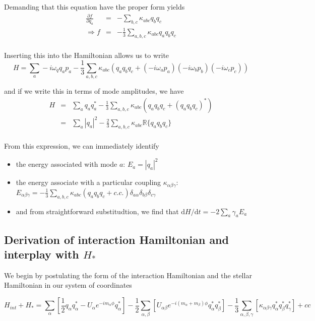 Demanding that this equation have the proper form yields
\begin{eqnarray}
\frac{\partial f}{\partial q_a} & = & - \sum_{b,c}\kappa_{abc} q_b q_c \\
\Rightarrow f & = & -\frac{1}{3}\sum_{a,b,c}\kappa_{abc} q_a q_b q_c \\
\end{eqnarray}

Inserting this into the Hamiltonian allows us to write
\begin{equation}
H = \sum_{a} -i\omega_q q_a p_a - \frac{1}{3} \sum_{a,b,c} \kappa_{abc} \left( q_a q_b q_c + (-i\omega_a p_a)(-i\omega_b p_b)(-i\omega_c p_c)\right)
\end{equation}

and if we write this in terms of mode amplitudes, we have
\begin{eqnarray}
H & = & \sum_{a} q_a q_a^\ast - \frac{1}{3} \sum_{a,b,c} \kappa_{abc} \left( q_a q_b q_c + (q_a q_b q_c)^\ast \right) \\
  & = & \sum_{a} |q_a|^2 - \frac{2}{3} \sum_{a,b,c} \kappa_{abc} \mathbb{R}\{ q_a q_b q_c \} \\
\end{eqnarray}

From this expression, we can immediately identify
\begin{itemize}
  \item{the energy associated with mode $a$: $E_a = |q_a|^2$}
  \item{the energy associate with a particular coupling $\kappa_{\alpha\beta\gamma}$: $E_{\alpha\beta\gamma} = -\frac{1}{3}\sum_{a,b,c} \kappa_{abc} (q_a q_b q_c + c.c.) \delta_{a\alpha} \delta_{b\beta} \delta_{c\gamma}$}
  \item{and from straightforward substitudtion, we find that $\mathrm{d}H/\mathrm{d}t = -2 \sum_{a} \gamma_a E_a$}
\end{itemize}

\subsection*{Derivation of interaction Hamiltonian and interplay with $H_\ast$}

We begin by postulating the form of the interaction Hamiltonian and the stellar Hamiltonian in our system of coordinates

\begin{equation}
H_{int} + H_{\ast} = \sum_{\alpha} \left[ \frac{1}{2} q_{\alpha} q_{\alpha}^\ast - U_{\alpha}e^{-i m_\alpha \phi} q_\alpha^\ast \right] - \frac{1}{2}\sum_{\alpha,\beta} \left[ U_{\alpha\beta}e^{-i(m_\alpha+m_\beta)\phi}q_\alpha^\ast q_\beta^\ast \right] - \frac{1}{3}\sum_{\alpha,\beta,\gamma} \left[\kappa_{\alpha\beta\gamma} q_\alpha^\ast q_\beta^\ast q_\gamma^\ast \right] + cc
\end{equation}

